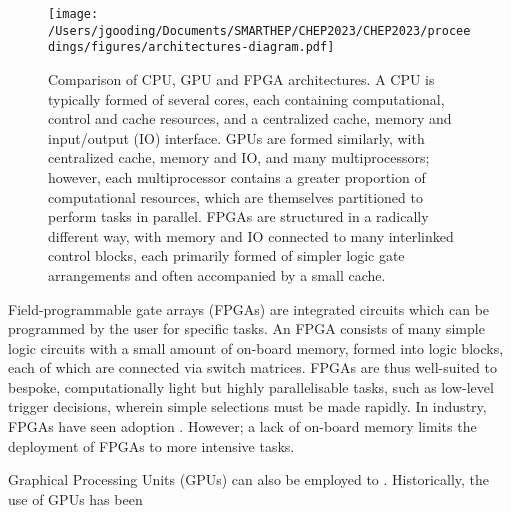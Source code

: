 \begin{figure*}[h!]
    \centering
    \texttt{[image: /Users/jgooding/Documents/SMARTHEP/CHEP2023/CHEP2023/proceedings/figures/architectures-diagram.pdf]}
    \caption{Comparison of CPU, GPU and FPGA architectures. A CPU is typically formed of several cores, each containing computational, control and cache resources, and a centralized cache, memory and input/output (IO) interface. GPUs are formed similarly, with centralized cache, memory and IO, and many multiprocessors; however, each multiprocessor contains a greater proportion of computational resources, which are themselves partitioned to perform tasks in parallel. FPGAs are structured in a radically different way, with memory and IO connected to many interlinked control blocks, each primarily formed of simpler logic gate arrangements and often accompanied by a small cache.}
    \label{architectures}       %
\end{figure*}

Field-programmable gate arrays (FPGAs) are integrated circuits which can be programmed by the user for specific tasks. \cite{fpgas-intro} An FPGA consists of many simple logic circuits with a small amount of on-board memory, formed into logic blocks, each of which are connected via switch matrices. \cite{fpgas-book} FPGAs are thus well-suited to bespoke, computationally light but highly parallelisable tasks, such as low-level trigger decisions, wherein simple selections must be made rapidly. \cite{duarte-fpgas} In industry, FPGAs have seen adoption . However; a lack of on-board memory limits the deployment of FPGAs to more intensive tasks.\par
Graphical Processing Units (GPUs) can also be employed to . \cite{vomBruch-gpus} Historically, the use of GPUs has been 
